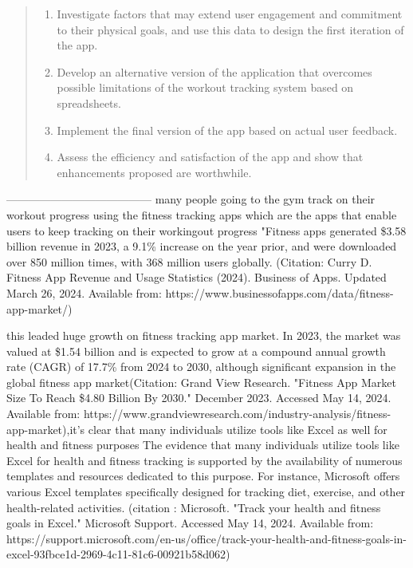\begin{quote}
    \begin{enumerate}
\item Investigate factors that may extend user engagement and commitment to their physical goals, and use this data to design the first iteration of the app.
\item Develop an alternative version of the application that overcomes possible limitations of the workout tracking system based on spreadsheets. 
\item Implement the final version of the app based on actual user feedback. 
\item Assess the efficiency and satisfaction of the app and show that enhancements proposed are worthwhile. 
\end{enumerate}
\end{quote}



---------------------------------------
many people going to the gym track on their workout progress using the fitness tracking apps which are the apps that enable users to keep tracking on their workingout progress
"Fitness apps generated \$3.58 billion revenue in 2023, a 9.1\% increase on the year prior, and were downloaded over 850 million times, with 368 million users globally.
(Citation: Curry D. Fitness App Revenue and Usage Statistics (2024). Business of Apps. Updated March 26, 2024. Available from: https://www.businessofapps.com/data/fitness-app-market/)

this leaded huge growth on fitness tracking app market.  In 2023, the market was valued at \$1.54 billion and is expected to grow at a compound annual growth rate (CAGR) of 17.7\% from 2024 to 2030,
although significant expansion in the global fitness app market(Citation: Grand View Research. "Fitness App Market Size To Reach \$4.80 Billion By 2030." December 2023. Accessed May 14, 2024. Available from: https://www.grandviewresearch.com/industry-analysis/fitness-app-market),it's clear that many individuals utilize tools like Excel as well for health and fitness purposes
The evidence that many individuals utilize tools like Excel for health and fitness tracking is supported by the availability of numerous templates and resources dedicated to this purpose. For instance, Microsoft offers various Excel templates specifically designed for tracking diet, exercise, and other health-related activities. (citation : Microsoft. "Track your health and fitness goals in Excel." Microsoft Support. Accessed May 14, 2024. Available from: https://support.microsoft.com/en-us/office/track-your-health-and-fitness-goals-in-excel-93fbce1d-2969-4c11-81c6-00921b58d062)

